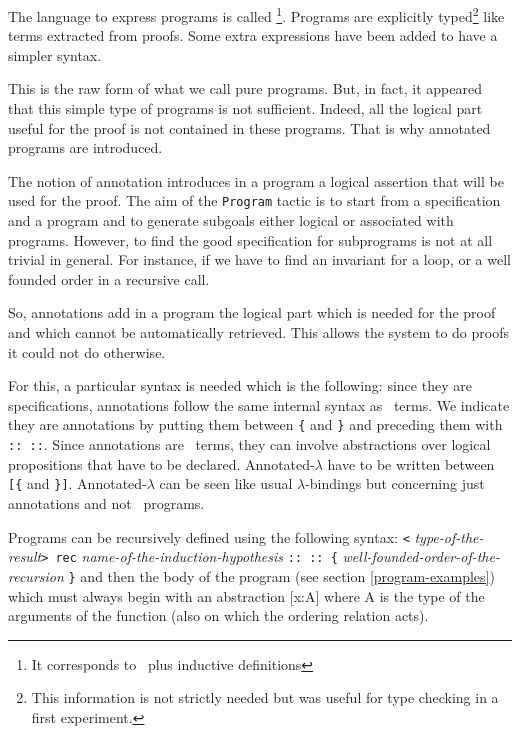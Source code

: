 \label{program-syntax}
The language to express programs is called \real\footnote{It
  corresponds to \FW\ plus inductive definitions}. Programs are
explicitly typed\footnote{This information is not strictly needed but
  was useful for type checking in a first experiment.} like terms
extracted from proofs. Some extra expressions have been added to have
a simpler syntax.

This is the raw form of what we call pure programs. But, in fact, it
appeared that this simple type of programs is not sufficient. Indeed,
all the logical part useful for the proof is not contained in these
programs. That is why annotated programs are introduced.

The notion of annotation introduces in a program a logical assertion
that will be used for the proof. The aim of the \verb=Program= tactic
is to start from a specification and a program and to generate
subgoals either logical or associated with programs. However, to find
the good specification for subprograms is not at all trivial in
general.  For instance, if we have to find an invariant for a loop, or
a well founded order in a recursive call.

So, annotations add in a program the logical part which is needed for
the proof and which cannot be automatically retrieved. This allows the
system to do proofs it could not do otherwise.

For this, a particular syntax is needed which is the following: since
they are specifications, annotations follow the same internal syntax
as \Coq~terms. We indicate they are annotations by putting them
between \verb={= and \verb=}= and preceding them with \verb=:: ::=.
Since annotations are \Coq~terms, they can involve abstractions over
logical propositions that have to be declared. Annotated-$\lambda$
have to be written between \verb=[{= and \verb=}]=.
Annotated-$\lambda$ can be seen like usual $\lambda$-bindings but
concerning just annotations and not \Coq~programs.

Programs can be recursively defined using the following syntax: \verb=<={\it
  type-of-the-result}\verb=> rec=  {\it
  name-of-the-induction-hypothesis} \verb=:: :: {= {\it
    well-founded-order-of-the-recursion} \verb=}= and then the body of
the program (see section \ref{program-examples}) which must always begin with
an abstraction [x:A] where A is the type of the arguments of the
function (also on which the ordering relation acts).

